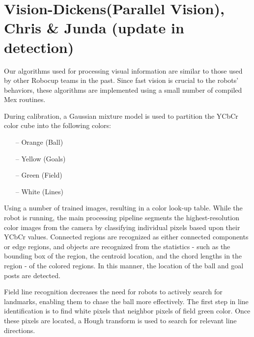 \documentclass{article}
\begin{document}
\section{Vision-Dickens(Parallel Vision), Chris \& Junda (update in detection)}
 	Our algorithms used for processing visual information are similar to those used by other Robocup teams in the past. Since fast vision is crucial to the robots’ behaviors, these algorithms are implemented using a small number of compiled Mex routines.

  During calibration, a Gaussian mixture model is used to partition the YCbCr color cube into the following colors:
	\begin{itemize}
		\item[--] Orange (Ball)
		\item[--] Yellow (Goals)
		\item[--] Green (Field)
		\item[--] White (Lines)
	\end{itemize}

  Using a number of trained images, resulting in a color look-up table. While the robot is running, the main processing pipeline segments the highest-resolution color images from the camera by classifying individual pixels based upon their YCbCr values. Connected regions are recognized as either connected components or edge regions, and objects are recognized from the statistics - such as the bounding box of the region, the centroid location, and the chord lengths in the region - of the colored regions. In this manner, the location of the ball and goal posts are detected.

  Field line recognition decreases the need for robots to actively search for landmarks, enabling them to chase the ball more effectively. The first step in line identification is to find white pixels that neighbor pixels of field green color. Once these pixels are located, a Hough transform is used to search for relevant line directions.
\end{document}
